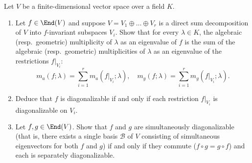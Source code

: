 \begin{exercise}
  \label{exc:direct_sum_multiplicities_and_simultaneous_diagonalizability}
  Let $V$ be a finite-di\-men\-sional vector space over a field $K$.
  \begin{enumerate}[label=\textbf{(\alph*)}]
    \item Let $f \in \End(V)$ and suppose $V = V_1 \oplus \dots \oplus V_r$ is a direct sum decomposition of $V$ into $f$-invariant subspaces $V_i$. Show that for every $\lambda \in K$, the algebraic (resp.\ geometric) multiplicity of $\lambda$ as an eigenvalue of $f$ is the sum of the algebraic (resp.\ geometric) multiplicities of $\lambda$ as an eigenvalue of the restrictions $f|_{V_i}$:
    \[
    m_a(f; \lambda) = \sum_{i=1}^r m_a(f|_{V_i}; \lambda), \quad m_g(f; \lambda) = \sum_{i=1}^r m_g(f|_{V_i}; \lambda).
    \]
    \item Deduce that $f$ is diagonalizable if and only if each restriction $f|_{V_i}$ is diagonalizable on $V_i$.
    \item Let $f, g \in \End(V)$. Show that $f$ and $g$ are simultaneously diagonalizable (that is, there exists a single basis $\mathcal{B}$ of $V$ consisting of simultaneous eigenvectors for both $f$ and $g$) if and only if they commute ($f \circ g = g \circ f$) and each is separately diagonalizable.
  \end{enumerate}
\end{exercise}

